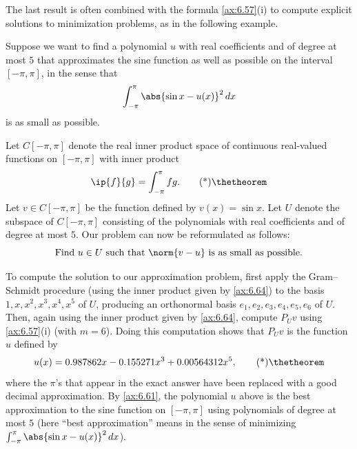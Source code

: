 The last result is often combined with the formula \ref{ax:6.57}(i) to compute
explicit solutions to minimization problems, as in the following example.

\begin{example}\label{ax:6.63}
Suppose we want to find a polynomial $u$ with real coefficients and of degree
at most $5$ that approximates the sine function as well as possible on the
interval $[-\pi,\pi]$, in the sense that
\[ \int_{-\pi}^{\pi} \abs{\sin x-u(x)}^2\,dx \]
is as small as possible.

Let $C[-\pi,\pi]$ denote the real inner product space of continuous real-valued
functions on $[-\pi,\pi]$ with inner product
\begin{equation*}
\ip{f}{g} = \int_{-\pi}^{\pi} fg. \axeqtag
\end{equation*}
Let $v\in C[-\pi,\pi]$ be the function defined by $v(x)=\sin x$. Let $U$ denote
the subspace of $C[-\pi,\pi]$ consisting of the polynomials with real
coefficients and of degree at most $5$. Our problem can now be reformulated as
follows:
\[ \text{Find } u\in U \text{ such that } \norm{v-u}
   \text{ is as small as possible.} \]

To compute the solution to our approximation problem, first apply the
Gram--Schmidt procedure (using the inner product given by \ref{ax:6.64}) to the
basis $1,x,x^2,x^3,x^4,x^5$ of $U$, producing an orthonormal basis
$e_1,e_2,e_3,e_4,e_5,e_6$ of $U$. Then, again using the inner product given by
\ref{ax:6.64}, compute $P_Uv$ using \ref{ax:6.57}(i) (with $m=6$). Doing this
computation shows that $P_Uv$ is the function $u$ defined
by
\begin{equation*}
u(x) = 0.987862x-0.155271x^3+0.00564312x^5, \axeqtag
\end{equation*}
where the $\pi$'s that appear in the exact answer have been replaced with a
good decimal approximation. By \ref{ax:6.61}, the polynomial $u$ above is the
best approximation to the sine function on $[-\pi,\pi]$ using polynomials of
degree at most $5$ (here ``best approximation'' means in the sense of
minimizing $\int_{-\pi}^{\pi}\abs{\sin x-u(x)}^2\,dx$).


\end{example}
